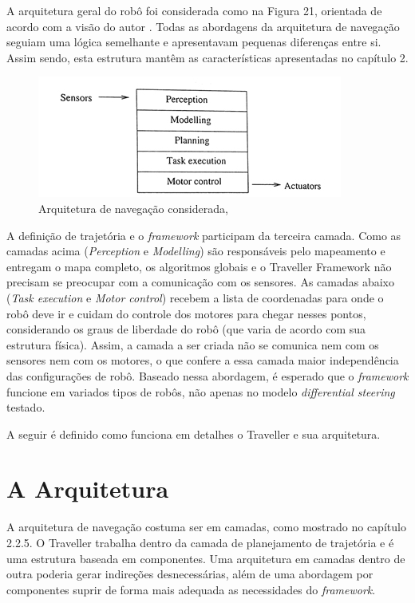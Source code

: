 A arquitetura geral do robô foi considerada como na Figura 21, orientada de acordo com a visão do autor \cite{Nehmzow2003}. Todas as abordagens da arquitetura de navegação seguiam uma lógica semelhante e apresentavam pequenas diferenças entre si. Assim sendo, esta estrutura mantêm as características apresentadas no capítulo 2.

\begin{figure}[h]
	\centering
	\label{fig21}
		\includegraphics[keepaspectratio=true,scale=1]{figuras/arqusada.jpg}
	\caption{Arquitetura de navegação considerada, \cite{Nehmzow2003}}
\end{figure}

A definição de trajetória e o \textit{framework} participam da terceira camada. Como as camadas acima (\textit{Perception} e \textit{Modelling}) são responsáveis pelo mapeamento e entregam o mapa completo, os algoritmos globais e o Traveller Framework não precisam se preocupar com a comunicação com os sensores. As camadas abaixo (\textit{Task execution} e \textit{Motor control}) recebem a lista de coordenadas para onde o robô deve ir e cuidam do controle dos motores para chegar nesses pontos, considerando os graus de liberdade do robô (que varia de acordo com sua estrutura física). Assim, a camada a ser criada não se comunica nem com os sensores nem com os motores, o que confere a essa camada maior independência das configurações de robô. Baseado nessa abordagem, é esperado que o \textit{framework} funcione em variados tipos de robôs, não apenas no modelo \textit{differential steering} testado.

A seguir é definido como funciona em detalhes o Traveller e sua arquitetura.

\section{A Arquitetura}

A arquitetura de navegação costuma ser em camadas, como mostrado no capítulo 2.2.5. O Traveller trabalha dentro da camada de planejamento de trajetória e é uma estrutura baseada em componentes. Uma arquitetura em camadas dentro de outra poderia gerar indireções desnecessárias, além de uma abordagem por componentes suprir de forma mais adequada as necessidades do \textit{framework}.

